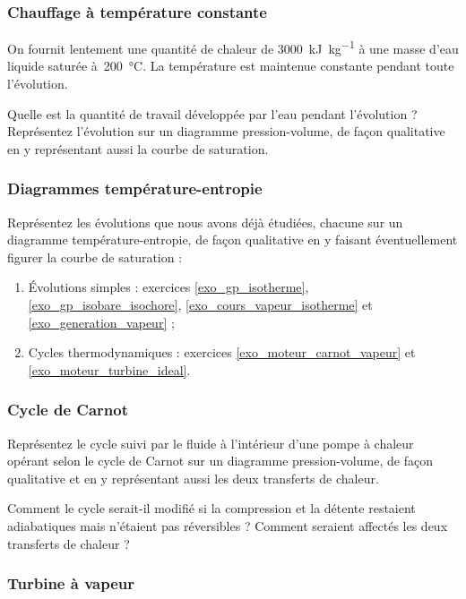 \subsubsection{Chauffage à température constante}
\label{exo_chauffage_isotherme_eau}

	On fournit lentement une quantité de chaleur de \SI{3000}{\kilo\joule\per\kilogram} à une masse d’eau liquide saturée à~\SI{200}{\degreeCelsius}. La température est maintenue constante pendant toute l’évolution.
	
	Quelle est la quantité de travail développée par l’eau pendant l’évolution ? Représentez l’évolution sur un diagramme pression-volume, de façon qualitative en y représentant aussi la courbe de saturation.


\subsubsection{Diagrammes température-entropie}
\label{exo_diagrammes_ts}

	Représentez les évolutions que nous avons déjà étudiées, chacune sur un diagramme température-entropie, de façon qualitative en y faisant éventuellement figurer la courbe de saturation  :
	
	\begin{enumerate}
		\item Évolutions simples : exercices \ref{exo_gp_isotherme}, \ref{exo_gp_isobare_isochore}, \ref{exo_cours_vapeur_isotherme} et \ref{exo_generation_vapeur} ;
		\item Cycles thermodynamiques : exercices \ref{exo_moteur_carnot_vapeur} et \ref{exo_moteur_turbine_ideal}.
	\end{enumerate}

	
\subsubsection{Cycle de Carnot}
\label{exo_ts_carnot}

	Représentez le cycle suivi par le fluide à l’intérieur d’une pompe à chaleur opérant selon le cycle de Carnot sur un diagramme pression-volume, de façon qualitative et en y représentant aussi les deux transferts de chaleur.
	
	Comment le cycle serait-il modifié si la compression et la détente restaient adiabatiques mais n’étaient pas réversibles ? Comment seraient affectés les deux transferts de chaleur ?

\subsubsection{Turbine à vapeur}
\label{exo_turbine_vapeur_isentropique}

